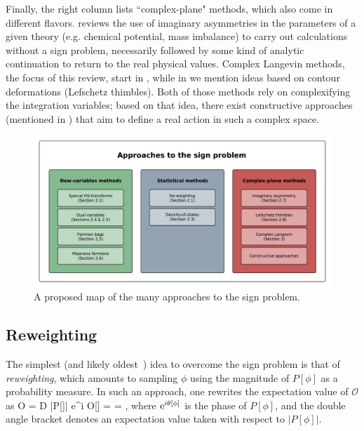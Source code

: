 \documentclass[../main.tex]{subfiles}
\begin{document}
Finally, the right column lists ``complex-plane" methods, which also come in different flavors.  reviews the use of imaginary asymmetries in the parameters of a given theory (e.g. chemical potential, mass imbalance) to carry out calculations without a sign problem, necessarily followed by some kind of analytic continuation to return to the real physical values.
Complex Langevin methods, the focus of this review, start in , while in  we mention ideas based on contour deformations (Lefschetz
thimbles). Both of those methods rely on complexifying the integration variables; based on that idea, there exist constructive approaches (mentioned in ) that aim to define a real action in such a complex space.
%
\begin{figure}[t]
  \centering
  \includegraphics[width=\columnwidth]{./2generalformalism/sign_problem_solutions.pdf}
  \caption{\label{fig:SPApproaches} A proposed map of the many approaches to the sign problem.}
\end{figure}


\subsection{Reweighting~\label{sect:reweighting}}

The simplest (and likely oldest~\cite{PhysRevLett.61.2635}) idea to overcome the sign problem is that of {\it reweighting}, which amounts to sampling $\phi$
using the magnitude of $P[\phi]$ as a probability measure. In such an approach, one rewrites the expectation
value of $\mathcal O$ as
%
\beq
\label{Eq:ReweightedO}
\langle  \mathcal O \rangle = \int \mathcal D \phi \; |P[\phi]| {\rm e}^{i\theta[\phi]} \mathcal O[\phi] =
 =
,
\eeq
%
where ${\rm e}^{i\theta[\phi]}$ is the phase of $P[\phi]$, and the double angle bracket denotes
an expectation value taken with respect to $|P[\phi]|$.
\end{document}
